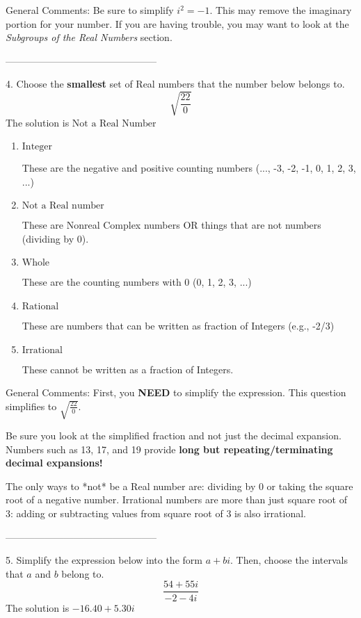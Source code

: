 \documentclass{article}[14pt]
\begin{document}
General Comments: Be sure to simplify $i^2 = -1$. This may remove the imaginary portion for your number. If you are having trouble, you may want to look at the \textit{Subgroups of the Real Numbers} section.

-----------------------------------------------

4. Choose the \textbf{smallest} set of Real numbers that the number below belongs to.
$$ \sqrt{\frac{22}{0}} $$ 
The solution is $ \text{Not a Real Number} $ 

\begin{enumerate}[label=\Alph*.] 
\item $ \text{Integer} $ 

 These are the negative and positive counting numbers (..., -3, -2, -1, 0, 1, 2, 3, ...) 
\item $ \text{Not a Real number} $ 

 These are Nonreal Complex numbers OR things that are not numbers (dividing by 0). 
\item $ \text{Whole} $ 

 These are the counting numbers with 0 (0, 1, 2, 3, ...) 
\item $ \text{Rational} $ 

 These are numbers that can be written as fraction of Integers (e.g., -2/3) 
\item $ \text{Irrational} $ 

 These cannot be written as a fraction of Integers. 
\end{enumerate} 
 
General Comments: First, you \textbf{NEED} to simplify the expression. This question simplifies to $\sqrt{\frac{22}{0}}$. 
 
 Be sure you look at the simplified fraction and not just the decimal expansion. Numbers such as 13, 17, and 19 provide \textbf{long but repeating/terminating decimal expansions!} 
 
 The only ways to *not* be a Real number are: dividing by 0 or taking the square root of a negative number. Irrational numbers are more than just square root of 3: adding or subtracting values from square root of 3 is also irrational.

-----------------------------------------------

5. Simplify the expression below into the form $a+bi$. Then, choose the intervals that $a$ and $b$ belong to.
$$ \frac{54  + 55 i}{-2  - 4 i} $$ 
The solution is $ -16.40  + 5.30 i $ 
\end{document}

